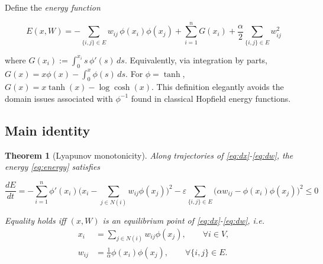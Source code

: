 \documentclass[3p]{elsarticle}
\newtheorem{theorem}{Theorem}
\newcommand{\eps}{\varepsilon}
\begin{document}
Define the \emph{energy function}

\begin{equation}
  \boxed{
  E(x,W) = -\sum_{\{i,j\}\in E} w_{ij}\,\phi(x_i)\phi(x_j)
           + \sum_{i=1}^n G(x_i)
           + \frac{\alpha}{2}\sum_{\{i,j\}\in E} w_{ij}^2
  } \label{eq:energy}
\end{equation}

where $G(x_i) := \int_0^{x_i} s\,\phi'(s)\,ds$. Equivalently, via integration by parts, $G(x) = x\phi(x) - \int_0^x \phi(s)\,ds$. For $\phi=\tanh$, $G(x) = x\tanh(x) - \log\cosh(x)$. This definition elegantly avoids the domain issues associated with $\phi^{-1}$ found in classical Hopfield energy functions.

\subsection{Main identity}

\begin{theorem}[Lyapunov monotonicity] \label{thm:1}
  Along trajectories of \eqref{eq:dx}-\eqref{eq:dw}, the energy \eqref{eq:energy} satisfies

  \begin{equation}
  \boxed{
  \frac{dE}{dt} = -\sum_{i=1}^n \phi'(x_i)\bigl(x_i - \sum_{j\in N(i)} w_{ij}\phi(x_j)\bigr)^2
                  - \eps\sum_{\{i,j\}\in E} \bigl(\alpha w_{ij} - \phi(x_i)\phi(x_j)\bigr)^2
                  \le 0
  } \label{eq:dEdt}
  \end{equation}

  Equality holds iff $(x,W)$ is an equilibrium point of \eqref{eq:dx}-\eqref{eq:dw}, i.e.
  \begin{align*}
    x_i &= \sum_{j\in N(i)} w_{ij}\phi(x_j), \qquad \forall i\in V,\\
    w_{ij} &= \frac{1}{\alpha}\phi(x_i)\phi(x_j), \qquad \forall \{i,j\}\in E.
  \end{align*}
\end{theorem}
\end{document}
